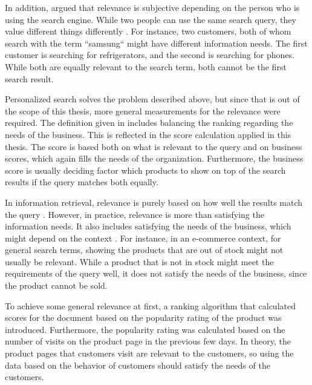 In addition, \citeauthor{relevantSearch} \cite{relevantSearch} argued that
relevance is subjective depending on the person who is using the search engine.
While two people can use the same search query, they value different things differently \cite{relevantSearch}.
For instance, two customers, both of whom search with the term ``samsung`` might have different 
information needs. 
The first customer is searching for refrigerators, and the second is searching for phones.
While both are equally relevant to the search term, both cannot be the first search result.


Personalized search solves the problem described above, but since that is out of the scope
of this thesis, more general measurements for the relevance were required.
The definition given in \cite{relevantSearch} includes balancing the ranking regarding the needs of the business.
This is reflected in the score calculation applied in this thesis.
The score is based both on  what is relevant to the query and on business scores,
which again fills the needs of the organization.
Furthermore, the business score is usually deciding factor which products to show on top 
of the search results if the query matches both equally.


In information retrieval, relevance is purely based on how well the results match the query 
\cite{relevantSearch}.
However, in practice, relevance is more than satisfying the information needs. 
It also includes satisfying the needs of the business, which might depend on the context 
\cite{relevantSearch}.
For instance, in an e-commerce context, for general search terms, 
showing the products that are out of stock might not usually be relevant. 
While a product that is not in stock might meet the requirements of the query well, 
it does not satisfy the needs of the business, since the product cannot be sold.


To achieve some general relevance at first, a ranking algorithm that calculated
scores for the document based on the popularity rating of the product was introduced.
Furthermore, the popularity rating was calculated based on the number of visits on
the product page in the previous few days.
In theory, the product pages that customers visit are relevant to the customers, so
using the data based on the behavior of customers should satisfy the needs of the customers.



